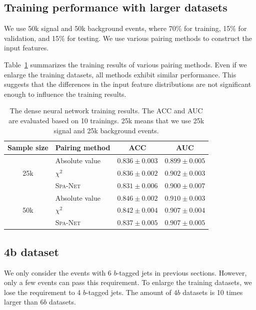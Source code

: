 \documentclass[12pt]{article}
\begin{document}
    \subsection{Training performance with larger datasets}%
    \label{sub:training_performance_with_larger_datasets}
         We use 50k signal and 50k background events, where 70\% for training, 15\% for validation, and 15\% for testing. We use various pairing methods to construct the input features.

        Table~\ref{tab:DNN_training_results_25k_50k} summarizes the training results of various pairing methods. Even if we enlarge the training datasets, all methods exhibit similar performance. This suggests that the differences in the input feature distributions are not significant enough to influence the training results.
        \begin{table}[htpb]
            \centering
            \caption{The dense neural network training results. The ACC and AUC are evaluated based on 10 trainings. 25k means that we use 25k signal and 25k background events.}
            \label{tab:DNN_training_results_25k_50k}
            \begin{tabular}{c|l|cc}
            Sample size          & Pairing method   & ACC               & AUC               \\ \hline
            \multirow{3}{*}{25k} & Absolute value   & $0.836 \pm 0.003$ & $0.899 \pm 0.005$ \\
                                 & $\chi^2$         & $0.836 \pm 0.002$ & $0.902 \pm 0.003$ \\
                                 & \textsc{Spa-Net} & $0.831 \pm 0.006$ & $0.900 \pm 0.007$ \\ \hline
            \multirow{3}{*}{50k} & Absolute value   & $0.846 \pm 0.002$ & $0.910 \pm 0.003$ \\ 
                                 & $\chi^2$         & $0.842 \pm 0.004$ & $0.907 \pm 0.004$ \\
                                 & \textsc{Spa-Net} & $0.837 \pm 0.005$ & $0.907 \pm 0.005$
            \end{tabular}
        \end{table}
    \subsection{4b dataset}%
    \label{sub:4b_dataset}
        We only consider the events with 6 $b$-tagged jets in previous sections. However, only a few events can pass this requirement. To enlarge the training datasets, we lose the requirement to 4 $b$-tagged jets. The amount of $4b$ datasets is 10 times larger than $6b$ datasets.
\end{document}
